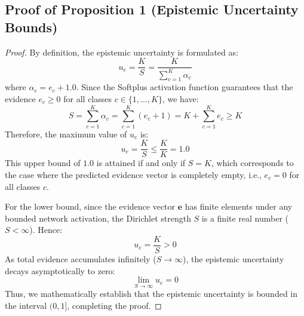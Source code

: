 \documentclass[letterpaper]{article} %
\begin{document}
\subsection{Proof of Proposition 1 (Epistemic Uncertainty Bounds)}
\begin{proof}
By definition, the epistemic uncertainty is formulated as:
\begin{equation}
    u_e = \frac{K}{S} = \frac{K}{\sum_{c=1}^K \alpha_c}
\end{equation}
where $\alpha_c = e_c + 1.0$. Since the Softplus activation function guarantees that the evidence $e_c \ge 0$ for all classes $c \in \{1, \ldots, K\}$, we have:
\begin{equation}
    S = \sum_{c=1}^K \alpha_c = \sum_{c=1}^K (e_c + 1) = K + \sum_{c=1}^K e_c \ge K
\end{equation}
Therefore, the maximum value of $u_e$ is:
\begin{equation}
    u_e = \frac{K}{S} \le \frac{K}{K} = 1.0
\end{equation}
This upper bound of $1.0$ is attained if and only if $S = K$, which corresponds to the case where the predicted evidence vector is completely empty, i.e., $e_c = 0$ for all classes $c$. 

For the lower bound, since the evidence vector $\bm{e}$ has finite elements under any bounded network activation, the Dirichlet strength $S$ is a finite real number ($S < \infty$). Hence:
\begin{equation}
    u_e = \frac{K}{S} > 0
\end{equation}
As total evidence accumulates infinitely ($S \to \infty$), the epistemic uncertainty decays asymptotically to zero:
\begin{equation}
    \lim_{S \to \infty} u_e = 0
\end{equation}
Thus, we mathematically establish that the epistemic uncertainty is bounded in the interval $(0, 1]$, completing the proof.
\end{proof}
\end{document}
